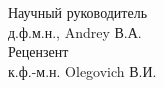 \documentclass{article}
\begin{document}
   \begin{flushright}                                                     
                       Научный руководитель    \\                                         
                       д.ф.м.н., Andrey В.А.    \\                                        
                       Рецензент                 \\                                       
                       к.ф.-м.н. Olegovich В.И.         \\                                
    \end{flushright}                                                        
                                                                                        
                                                                                        
    \vspace{\fill}                                                    
                                                                                        
                                                                                        
    
\end{document}
